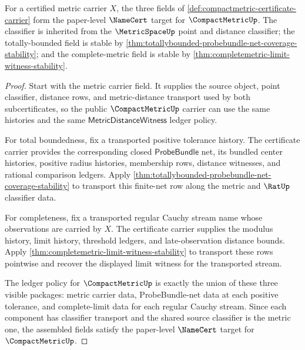 \begin{theorem}
\label{thm:compactmetric-certificate-package}
For a certified metric carrier $X$, the three fields of
\autoref{def:compactmetric-certificate-carrier} form the paper-level
$\NameCert$ target for $\CompactMetricUp$. The classifier is inherited from
the $\MetricSpaceUp$ point and distance classifier; the totally-bounded field
is stable by
\autoref{thm:totallybounded-probebundle-net-coverage-stability}; and the
complete-metric field is stable by
\autoref{thm:completemetric-limit-witness-stability}.
\end{theorem}
\begin{proof}
Start with the metric carrier field. It supplies the source object, point
classifier, distance rows, and metric-distance transport used by both
subcertificates, so the public $\CompactMetricUp$ carrier can use the same
histories and the same $\mathsf{MetricDistanceWitness}$ ledger policy.

For total boundedness, fix a transported positive tolerance history. The
certificate carrier provides the corresponding closed $\mathsf{ProbeBundle}$
net, its bundled center histories, positive radius histories, membership
rows, distance witnesses, and rational comparison ledgers. Apply
\autoref{thm:totallybounded-probebundle-net-coverage-stability} to transport
this finite-net row along the metric and $\RatUp$ classifier data.

For completeness, fix a transported regular Cauchy stream name whose
observations are carried by $X$. The certificate carrier supplies the modulus
history, limit history, threshold ledgers, and late-observation distance
bounds. Apply
\autoref{thm:completemetric-limit-witness-stability} to transport these rows
pointwise and recover the displayed limit witness for the transported stream.

The ledger policy for $\CompactMetricUp$ is exactly the union of these three
visible packages: metric carrier data, ProbeBundle-net data at each positive
tolerance, and complete-limit data for each regular Cauchy stream. Since each
component has classifier transport and the shared source classifier is the
metric one, the assembled fields satisfy the paper-level $\NameCert$ target
for $\CompactMetricUp$.
\end{proof}

